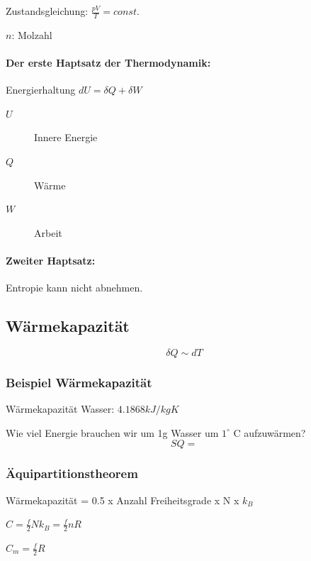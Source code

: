 \documentclass[a4paper]{scrartcl}
\begin{document}
Zustandsgleichung: $\frac{pV}{T} = const.$



$n$: Molzahl





\paragraph{Der erste Haptsatz der Thermodynamik:}

Energierhaltung $dU = \delta Q + \delta W$

\begin{description}
	\item[$U$] Innere Energie
	\item[$Q$] Wärme
	\item[$W$] Arbeit
\end{description}

\paragraph{Zweiter Haptsatz:}

Entropie kann nicht abnehmen.

\subsection{Wärmekapazität}

\[
	\delta Q \sim dT
\]

\subsubsection{Beispiel Wärmekapazität}

Wärmekapazität Wasser: $4.1868 kJ / kg K$

Wie viel Energie brauchen wir um 1g Wasser um $1^\circ$ C aufzuwärmen?
\[
SQ = 
\]





\subsubsection{Äquipartitionstheorem}

Wärmekapazität = 0.5 x Anzahl Freiheitsgrade x N x $k_B$

$C = \frac{f}{2}N k_B = \frac{f}{2} nR$

$C_m = \frac{f}{2} R$
\end{document}
